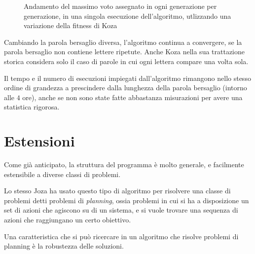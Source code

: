 \documentclass[paper=a4, fontsize=11pt]{scrartcl}
\numberwithin{equation}{section}		%
\numberwithin{figure}{section}			%
\numberwithin{table}{section}				%
\begin{document}
\begin{figure}

\caption{Andamento del massimo voto assegnato in ogni generazione per generazione, in una singola esecuzione dell'algoritmo, utlizzando una variazione della fitness di Koza}
\end{figure}


Cambiando la parola bersaglio diversa, l'algoritmo continua a convergere, se la parola bersaglio non contiene lettere ripetute. Anche Koza nella sua trattazione storica considera solo il caso di parole in cui ogni lettera compare una volta sola.
 
Il tempo e il numero di esecuzioni impiegati dall'algoritmo rimangono nello stesso ordine di grandezza a prescindere dalla lunghezza della parola bersaglio (intorno alle $4$ ore), anche se non sono state fatte abbastanza misurazioni per avere una statistica rigorosa. 




\section{Estensioni}
Come già anticipato, la struttura del programma è molto generale, e facilmente estensibile a diverse classi di problemi.

Lo stesso Joza ha usato questo tipo di algoritmo per risolvere una classe di problemi detti problemi di \emph{planning}, ossia problemi in cui si ha a disposizione un set di azioni che agiscono su di un sistema, e si vuole trovare una sequenza di azioni che raggiungano un certo obiettivo.

Una caratteristica che si può ricercare in un algoritmo che risolve problemi di planning è la robustezza delle soluzioni.
\end{document}
